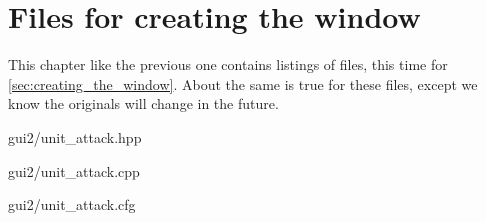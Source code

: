 \chapter{Files for creating the window}

This chapter like the previous one contains listings of files, this time for
\cref{sec:creating_the_window}. About the same is true for these files, except
we know the originals will change in the future.


	{gui2/unit_attack.hpp}


	{gui2/unit_attack.cpp}


	{gui2/unit_attack.cfg}
